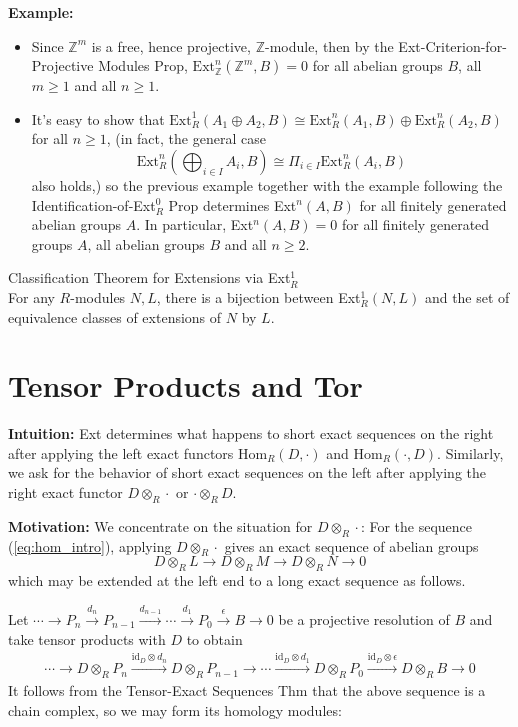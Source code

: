 \noindent\textbf{Example:} \begin{itemize}
    \item Since $\mathbb{Z}^m$ is a free, hence projective, $\mathbb{Z}$-module, then by the Ext-Criterion-for-Projective Modules Prop, $\text{Ext}_\mathbb{Z}^n (\mathbb{Z}^m ,B)=0$ for all abelian groups $B$, all $m\geq 1$ and all $n\geq 1$.

    \item It's easy to show that $\text{Ext}_R^1 (A_1 \oplus A_2,B) \cong \text{Ext}_R^n (A_1,B) \oplus \text{Ext}_R^n (A_2, B)$ for all $n\geq 1$, (in fact, the general case
    \[
    \text{Ext}_R^n (\bigoplus_{i\in I} A_i,B) \cong \Pi_{i\in I} \text{Ext}_R^n (A_i,B)
    \]
    also holds,) so the previous example together with the example following the Identification-of-Ext$^0_R$ Prop determines Ext$^n (A,B)$ for all finitely generated abelian groups $A$. In particular, Ext$^n(A,B)=0$ for all finitely generated groups $A$, all abelian groups $B$ and all $n \geq 2$.
\end{itemize}

\begin{theorem}{Classification Theorem for Extensions via Ext$_R^1$}\\
For any $R$-modules $N,L$, there is a bijection between Ext$_R^1 (N,L)$ and the set of equivalence classes of extensions of $N$ by $L$.
\end{theorem}

\section{Tensor Products and Tor}

\noindent\textbf{Intuition:} Ext determines what happens to short exact sequences on the right after applying the left exact functors $\text{Hom}_R (D,\cdot)$ and $\text{Hom}_R (\cdot, D)$. Similarly, we ask for the behavior of short exact sequences on the left after applying the right exact functor $D\otimes_R \cdot$ or $\cdot \otimes_R D$.

\noindent\textbf{Motivation:} We concentrate on the situation for $D\otimes_R \cdot$: For the sequence (\ref{eq:hom_intro}), applying $D \otimes_R \cdot$ gives an exact sequence of abelian groups
\[
D\otimes_RL \to D\otimes_RM \to D\otimes_RN \to 0
\]
which may be extended at the left end to a long exact sequence as follows.

Let $\cdots\to P_n \xrightarrow{d_n} P_{n-1} \xrightarrow{d_{n-1}} \cdots \xrightarrow{d_1} P_0 \xrightarrow{\epsilon} B\to0$ be a projective resolution of $B$ and take tensor products with $D$ to obtain
\begin{align*}
    \cdots \to D\otimes_R P_n \xrightarrow{\text{id}_D \otimes d_n} D\otimes_R P_{n-1} \to \cdots \xrightarrow{\text{id}_D\otimes d_1} D\otimes_RP_0 \xrightarrow{\text{id}_D \otimes \epsilon} D\otimes_RB \to 0
\end{align*}
It follows from the Tensor-Exact Sequences Thm that the above sequence is a chain complex, so we may form its homology modules:

